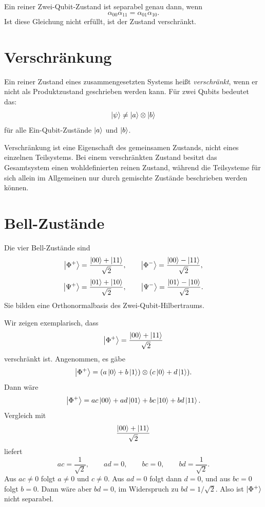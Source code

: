 \begin{formulabox}
Ein reiner Zwei-Qubit-Zustand ist separabel genau dann, wenn
\[
    \alpha_{00}\alpha_{11}=\alpha_{01}\alpha_{10}.
\]
Ist diese Gleichung nicht erfüllt, ist der Zustand verschränkt.
\end{formulabox}

\section{Verschränkung}

Ein reiner Zustand eines zusammengesetzten Systems heißt \emph{verschränkt}, wenn er nicht als Produktzustand geschrieben werden kann. Für zwei Qubits bedeutet das:
\[
    \left|\psi\right\rangle\neq \left|a\right\rangle\otimes\left|b\right\rangle
\]
für alle Ein-Qubit-Zustände \(\left|a\right\rangle\) und \(\left|b\right\rangle\).

\begin{conceptbox}
Verschränkung ist eine Eigenschaft des gemeinsamen Zustands, nicht eines einzelnen Teilsystems. Bei einem verschränkten Zustand besitzt das Gesamtsystem einen wohldefinierten reinen Zustand, während die Teilsysteme für sich allein im Allgemeinen nur durch gemischte Zustände beschrieben werden können.
\end{conceptbox}

\section{Bell-Zustände}

Die vier Bell-Zustände sind
\[
    \left|\Phi^+\right\rangle=\frac{\left|00\right\rangle+\left|11\right\rangle}{\sqrt2},
    \qquad
    \left|\Phi^-\right\rangle=\frac{\left|00\right\rangle-\left|11\right\rangle}{\sqrt2},
\]
\[
    \left|\Psi^+\right\rangle=\frac{\left|01\right\rangle+\left|10\right\rangle}{\sqrt2},
    \qquad
    \left|\Psi^-\right\rangle=\frac{\left|01\right\rangle-\left|10\right\rangle}{\sqrt2}.
\]
Sie bilden eine Orthonormalbasis des Zwei-Qubit-Hilbertraums.

\begin{derivationbox}
Wir zeigen exemplarisch, dass
\[
    \left|\Phi^+\right\rangle=\frac{\left|00\right\rangle+\left|11\right\rangle}{\sqrt2}
\]
verschränkt ist. Angenommen, es gäbe
\[
    \left|\Phi^+\right\rangle=(a\left|0\right\rangle+b\left|1\right\rangle)\otimes(c\left|0\right\rangle+d\left|1\right\rangle).
\]
Dann wäre
\[
    \left|\Phi^+\right\rangle
    =ac\left|00\right\rangle+ad\left|01\right\rangle+bc\left|10\right\rangle+bd\left|11\right\rangle.
\]
Vergleich mit
\[
    \frac{\left|00\right\rangle+\left|11\right\rangle}{\sqrt2}
\]
liefert
\[
    ac=\frac{1}{\sqrt2},
    \qquad
    ad=0,
    \qquad
    bc=0,
    \qquad
    bd=\frac{1}{\sqrt2}.
\]
Aus \(ac\neq0\) folgt \(a\neq0\) und \(c\neq0\). Aus \(ad=0\) folgt dann \(d=0\), und aus \(bc=0\) folgt \(b=0\). Dann wäre aber \(bd=0\), im Widerspruch zu \(bd=1/\sqrt2\). Also ist \(\left|\Phi^+\right\rangle\) nicht separabel.
\end{derivationbox}

